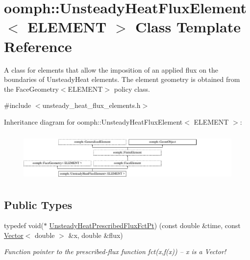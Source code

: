 \hypertarget{classoomph_1_1UnsteadyHeatFluxElement}{}\section{oomph\+:\+:Unsteady\+Heat\+Flux\+Element$<$ E\+L\+E\+M\+E\+NT $>$ Class Template Reference}
\label{classoomph_1_1UnsteadyHeatFluxElement}


A class for elements that allow the imposition of an applied flux on the boundaries of Unsteady\+Heat elements. The element geometry is obtained from the Face\+Geometry$<$\+E\+L\+E\+M\+E\+N\+T$>$ policy class.  




{\ttfamily \#include $<$unsteady\+\_\+heat\+\_\+flux\+\_\+elements.\+h$>$}

Inheritance diagram for oomph\+:\+:Unsteady\+Heat\+Flux\+Element$<$ E\+L\+E\+M\+E\+NT $>$\+:\begin{figure}[H]
\begin{center}
\leavevmode
\includegraphics[height=2.565865cm]{classoomph_1_1UnsteadyHeatFluxElement}
\end{center}
\end{figure}
\subsection*{Public Types}
\begin{DoxyCompactItemize}
\item 
typedef void($\ast$ \hyperlink{classoomph_1_1UnsteadyHeatFluxElement_ab60a211e1cee492be6c9b93d6aa36883}{Unsteady\+Heat\+Prescribed\+Flux\+Fct\+Pt}) (const double \&time, const \hyperlink{classoomph_1_1Vector}{Vector}$<$ double $>$ \&x, double \&flux)
\begin{DoxyCompactList}\small\item\em Function pointer to the prescribed-\/flux function fct(x,f(x)) -- x is a Vector! \end{DoxyCompactList}\end{DoxyCompactItemize}
